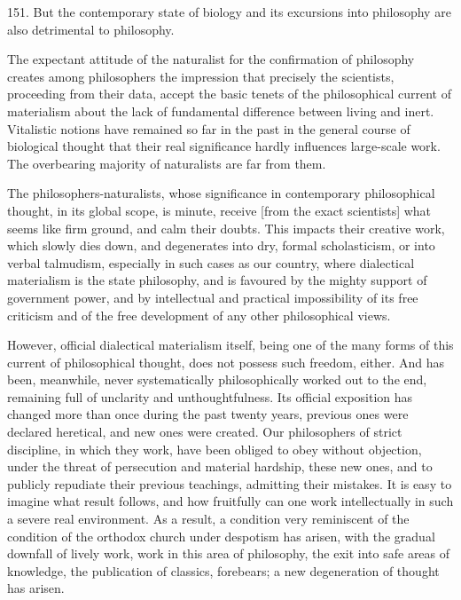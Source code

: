 
151. But the contemporary state of biology and its excursions into philosophy
are also detrimental to philosophy.

The expectant attitude of the naturalist for the confirmation of philosophy
creates among philosophers the impression that precisely the
scientists, proceeding from their data, accept the basic tenets of the philosophical
current of materialism about the lack of fundamental difference between living
and inert.  Vitalistic notions have remained so far in the past in the general
course of biological thought that their real significance hardly influences
large-scale work.  The overbearing majority of naturalists are far from them.

The philosophers-naturalists, whose significance in contemporary philosophical
thought, in its global scope, is minute, receive [from the exact scientists]
what seems like firm ground, and calm their doubts.  This impacts their
creative work, which slowly dies down, and degenerates into dry, formal
scholasticism, or into verbal talmudism, especially in such cases as our
country, where dialectical materialism is the state philosophy, and is
favoured by the mighty support of government power, and by intellectual and
practical impossibility of its free criticism and of the free development of
any other philosophical views.

However, official dialectical materialism itself, being one of the many forms
of this current of philosophical thought, does not possess such freedom,
either.  And has been, meanwhile, never systematically philosophically worked
out to the end, remaining full of unclarity and unthoughtfulness.  Its official
exposition has changed more than once during the past twenty years, previous
ones were declared heretical, and new ones were created.  Our philosophers of
strict discipline, in which they work, have been obliged to obey without
objection, under the threat of persecution and material hardship, these new
ones, and to publicly repudiate their previous teachings, admitting their
mistakes.  It is easy to imagine what result follows, and how fruitfully can
one work intellectually in such a severe real environment.  As a result, a
condition very reminiscent of the condition of the orthodox church under
despotism has arisen, with the gradual downfall of lively work, work in this
area of philosophy, the exit into safe areas of knowledge, the publication of
classics, forebears; a new degeneration of thought has arisen.


